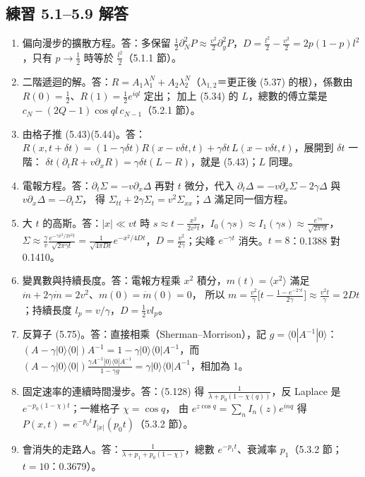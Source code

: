 \subsection{練習 5.1--5.9 解答}
{\small
\begin{enumerate}[label=\textbf{5.\arabic*},itemsep=0.05em]
\item 偏向漫步的擴散方程。\quad 答：多保留 $\frac12\partial_N^2P\approx\frac{v^2}2\partial_y^2P$，$D=\frac{l^2}2-\frac{v^2}2=2p(1-p)l^2$，只有 $p\to\frac12$ 時等於 $\frac{l^2}2$（5.1.1 節）。
\item 二階遞迴的解。\quad 答：$R=A_1\lambda_1^N+A_2\lambda_2^N$（$\lambda_{1,2}$＝更正後 (5.37) 的根），係數由 $R(0)=\frac12$、$R(1)=\frac12e^{iql}$ 定出；
加上 (5.34) 的 $L$，總數的傅立葉是 $c_N-(2Q-1)\cos ql\,c_{N-1}$（5.2.1 節）。
\item 由格子推 (5.43)(5.44)。\quad 答：$R(x,t+\delta t)=(1-\gamma\delta t)R(x-v\delta t,t)+\gamma\delta t\,L(x-v\delta t,t)$，展開到 $\delta t$ 一階：
$\delta t(\partial_tR+v\partial_xR)=\gamma\delta t(L-R)$，就是 (5.43)；$L$ 同理。
\item 電報方程。\quad 答：$\partial_t\Sigma=-v\partial_x\Delta$ 再對 $t$ 微分，代入 $\partial_t\Delta=-v\partial_x\Sigma-2\gamma\Delta$ 與 $v\partial_x\Delta=-\partial_t\Sigma$，
得 $\Sigma_{tt}+2\gamma\Sigma_t=v^2\Sigma_{xx}$；$\Delta$ 滿足同一個方程。
\item 大 $t$ 的高斯。\quad 答：$|x|\ll vt$ 時 $s\approx t-\frac{x^2}{2v^2t}$，$I_0(\gamma s)\approx I_1(\gamma s)\approx\frac{e^{\gamma s}}{\sqrt{2\pi\gamma t}}$，
$\Sigma\approx\frac{\gamma}{v}\frac{e^{-\gamma x^2/2v^2t}}{\sqrt{2\pi\gamma t}}=\frac{1}{\sqrt{4\pi Dt}}e^{-x^2/4Dt}$，$D=\frac{v^2}{2\gamma}$；尖峰 $e^{-\gamma t}$ 消失。$t=8$：0.1388 對 0.1410。
\item 變異數與持續長度。\quad 答：電報方程乘 $x^2$ 積分，$m(t)=\langle x^2\rangle$ 滿足 $\ddot m+2\gamma\dot m=2v^2$、$m(0)=\dot m(0)=0$，
所以 $m=\frac{v^2}{\gamma}\big[t-\frac{1-e^{-2\gamma t}}{2\gamma}\big]\approx\frac{v^2t}{\gamma}=2Dt$；持續長度 $l_p=v/\gamma$，$D=\frac12vl_p$。
\item 反算子 (5.75)。\quad 答：直接相乘（Sherman--Morrison），記 $g=\langle0|A^{-1}|0\rangle$：
$(A-\gamma|0\rangle\langle0|)A^{-1}=1-\gamma|0\rangle\langle0|A^{-1}$，而 $(A-\gamma|0\rangle\langle0|)\frac{\gamma A^{-1}|0\rangle\langle0|A^{-1}}{1-\gamma g}=\gamma|0\rangle\langle0|A^{-1}$，相加為 1。
\item 固定速率的連續時間漫步。\quad 答：(5.128) 得 $\frac1{\lambda+p_0(1-\chi(q))}$，反 Laplace 是 $e^{-p_0(1-\chi)t}$；一維格子 $\chi=\cos q$，
由 $e^{z\cos q}=\sum_nI_n(z)e^{inq}$ 得 $P(x,t)=e^{-p_0t}I_{|x|}(p_0t)$（5.3.2 節）。
\item 會消失的走路人。\quad 答：$\frac1{\lambda+p_1+p_0(1-\chi)}$，總數 $e^{-p_1t}$、衰減率 $p_1$（5.3.2 節；$t=10$：0.3679）。
\end{enumerate}}

